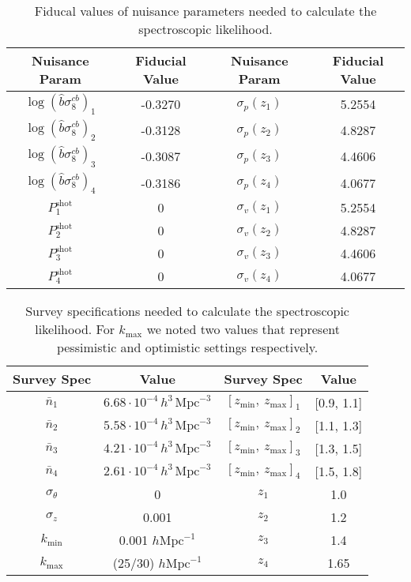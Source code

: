 \documentclass[../main.tex]{subfiles}
\begin{document}
\begin{table}
    \centering
    \begin{tabular}{c|c||c|c}
        \hline
        \rowcolor{cyan}Nuisance Param &Fiducial Value&Nuisance Param &Fiducial Value\\
    \hline
    $\log\left(\hat{b}\sigma_8^{cb}\right)_1$ & -0.3270 & $\sigma_p(z_1)$ & 5.2554\\  
    $\log\left(\hat{b}\sigma_8^{cb}\right)_2$ & -0.3128 & $\sigma_p(z_2)$ & 4.8287\\  
    $\log\left(\hat{b}\sigma_8^{cb}\right)_3$ & -0.3087 & $\sigma_p(z_3)$ & 4.4606\\  
    $\log\left(\hat{b}\sigma_8^{cb}\right)_4$ & -0.3186 & $\sigma_p(z_4)$ & 4.0677\\  
    $ P_1^\mathrm{shot}$ & 0                            & $\sigma_v(z_1)$ & 5.2554\\  
    $ P_2^\mathrm{shot}$ & 0                            & $\sigma_v(z_2)$ & 4.8287\\  
    $ P_3^\mathrm{shot}$ & 0                            & $\sigma_v(z_3)$ & 4.4606\\  
    $ P_4^\mathrm{shot}$ & 0                            & $\sigma_v(z_4)$ & 4.0677\\  
\end{tabular}
\caption{Fiducal values of nuisance parameters needed to calculate the spectroscopic likelihood.}
\label{tab:spectro_nuisance}
\end{table}

\begin{table}
    \centering
    
    \begin{tabular}{c|c||c|c}
        \hline
        \rowcolor{cyan}Survey Spec& Value&Survey Spec& Value\\
    \hline
     $\bar{n}_1$ & $6.68\cdot10^{-4}\,h^{3}\,\mathrm{Mpc}^{-3}$           &$[z_\mathrm{min},\:z_\mathrm{max}]_1$ & [0.9, 1.1]\\
     $\bar{n}_2$ & $5.58\cdot10^{-4}\,h^{3}\,\mathrm{Mpc}^{-3}$           &$[z_\mathrm{min},\:z_\mathrm{max}]_2$ & [1.1, 1.3]\\
     $\bar{n}_3$ & $4.21\cdot10^{-4}\,h^{3}\,\mathrm{Mpc}^{-3}$           &$[z_\mathrm{min},\:z_\mathrm{max}]_3$ & [1.3, 1.5]\\
     $\bar{n}_4$ & $2.61\cdot10^{-4}\,h^{3}\,\mathrm{Mpc}^{-3}$           &$[z_\mathrm{min},\:z_\mathrm{max}]_4$ & [1.5, 1.8]\\
     $\sigma_\theta$      & 0                            &$z_1$&1.0\\
     $\sigma_z$           & 0.001                        &$z_2$&1.2\\
     $k_\mathrm{min}$     & 0.001 $h \mathrm{Mpc}^{-1}  $&$z_3$&1.4\\
     $k_\mathrm{max}$     & (25/30) $h \mathrm{Mpc}^{-1}$&$z_4$&1.65\\
\end{tabular}
\caption{Survey specifications needed to calculate the spectroscopic likelihood. For $k_\mathrm{max}$ we noted two values that represent pessimistic and optimistic settings respectively.}
\label{tab:spectro_specifics}
\end{table}
\end{document}
